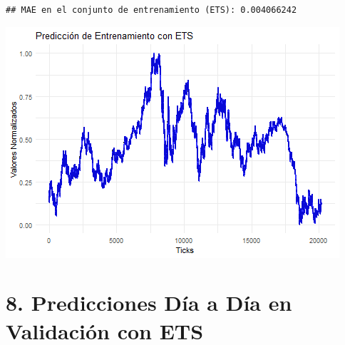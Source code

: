 \documentclass[
]{book}
\begin{document}
\begin{verbatim}
## MAE en el conjunto de entrenamiento (ETS): 0.004066242
\end{verbatim}

\includegraphics{bookdown_time_series_files/figure-latex/unnamed-chunk-17-1.png}

\section{8. Predicciones Día a Día en Validación con ETS}\label{predicciones-duxeda-a-duxeda-en-validaciuxf3n-con-ets}
\end{document}
